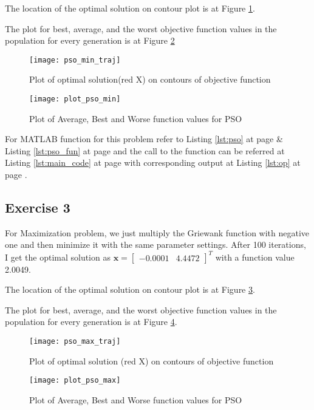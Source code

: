 \documentclass[11pt]{article}
\newcommand{\V}[1]{\pmb{#1}}
\newcommand{\mat}[1]{\begin{bmatrix}#1\end{bmatrix}}
\newcommand{\reflst}[1]{Listing \ref{#1} at page \pageref{#1}}
\newcommand{\reffig}[1]{Figure \ref{#1}}
\begin{document}
\noindent The location of the optimal solution on contour plot is at \reffig{fig:pso_min_cont}.

\noindent The plot for best, average, and the worst objective function values in the population for every generation is at \reffig{fig:pso_min}

\begin{figure}[!h]
 \centering
 \texttt{[image: pso\_min\_traj]}
 \caption{Plot of optimal solution(red X) on contours of objective function}
 \label{fig:pso_min_cont}
\end{figure}

\begin{figure}[!h]
 \centering
 \texttt{[image: plot\_pso\_min]}
 \caption{Plot of Average, Best and Worse function values for PSO}
 \label{fig:pso_min}
\end{figure}

\noindent For MATLAB function for this problem refer to \reflst{lst:pso} \& \reflst{lst:pso_fun} and the call to the function can be referred at \reflst{lst:main_code} with corresponding output at \reflst{lst:op}.
%
\clearpage
\vspace{2ex}
%
\subsection*{Exercise 3}
For Maximization problem, we just multiply the Griewank function with negative one and then minimize it with the same parameter settings. After 100 iterations, I get the optimal solution as $\V{x}=\mat{   -0.0001 &    4.4472}^T$ with a function value 2.0049. 

\noindent The location of the optimal solution on contour plot is at \reffig{fig:pso_max_cont}.

\noindent The plot for best, average, and the worst objective function values in the population for every generation is at \reffig{fig:pso_max}.

\begin{figure}[!h]
 \centering
 \texttt{[image: pso\_max\_traj]}
 \caption{Plot of optimal solution (red X) on contours of objective function}
 \label{fig:pso_max_cont}
\end{figure}

\begin{figure}[!h]
 \centering
 \texttt{[image: plot\_pso\_max]}
 \caption{Plot of Average, Best and Worse function values for PSO}
 \label{fig:pso_max}
\end{figure}
\end{document}

